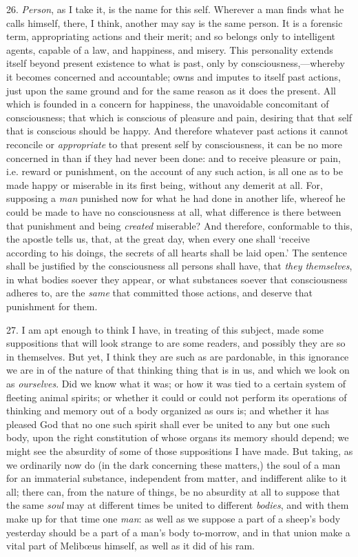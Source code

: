 26. \textit{Person}, as I take it, is the name for this self. Wherever
a man finds what he calls himself, there, I think, another 
may say is the same person. It is a forensic term, appropriating
actions and their merit; and so belongs only to intelligent agents,
capable of a law, and happiness, and misery. This personality extends
itself beyond present existence to what is past, only by
consciousness,---where\-by it becomes concerned and accountable; owns
and imputes to itself past actions, just upon the same ground and for
the same reason as it does the present. All which is founded in a
concern for happiness, the unavoidable concomitant of consciousness;
that which is conscious of pleasure and pain, desiring that that self
that is conscious should be happy. And therefore whatever past actions
it cannot reconcile or \textit{appropriate} to that present self by
consciousness, it can be no more concerned in than if they had never
been done: and to receive pleasure or pain, i.e. reward or punishment,
on the account of any such action, is all one as to be made happy or
miserable  in its first being, without any demerit at all.
For, supposing a \textit{man} punished now for what he had done in
another life, whereof he could be made to have no consciousness at
all, what difference is there between that punishment and being
\textit{created} miserable? And therefore, conformable to this, the
apostle tells us, that, at the great day, when every one shall
`receive according to his doings, the secrets of all hearts shall be
laid open.' The sentence shall be justified by the consciousness all
persons shall have, that \textit{they themselves}, in what bodies
soever they appear, or what substances soever that consciousness
adheres to, are the \textit{same} that committed those actions, and
deserve that punishment for them.

27. I am apt enough to think I have, in treating of this subject, made
some suppositions that will look strange to are some readers, and
possibly they are so in themselves. But yet, I think they are such as
are pardonable, in this ignorance we are in of the nature of that
thinking thing that is in us, and which we look on as
\textit{ourselves}. Did we know what it  was; or how it was
tied to a certain system of fleeting animal spirits; or whether it
could or could not perform its operations of thinking and memory out
of a body organized as ours is; and whether it has pleased God that no
one such spirit shall ever be united to any but one such body, upon
the right constitution of whose organs its memory should depend; we
might see the absurdity of some of those suppositions I have made. But
taking, as we ordinarily now do (in the dark concerning these
matters,) the soul of a man for an immaterial substance, independent
from matter, and indifferent alike to it all; there can, from the
nature of things, be no absurdity at all to suppose that the same
\textit{soul} may at different times be united to different
\textit{bodies}, and with them make up for that time one \textit{man}:
as well as we suppose a part of a sheep's body yesterday should be a
part of a man's body to-morrow, and in that union make a vital part of
Melib\oe us himself, as well as it did of his ram.

